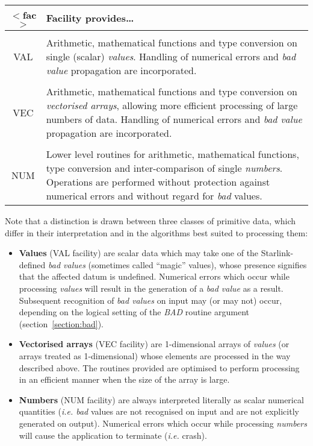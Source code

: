 \documentclass[11pt,nolof]{starlink}
\providecommand{\name}[1]{#1}
\providecommand{\fortvar}[1]{\emph{#1}}
\begin{document}
\begin{center}
\begin{tabular}{c|p{33em}}

\textbf{$<$fac$>$} & \textbf{Facility provides\ldots } \\
\hline
\\
VAL & Arithmetic, mathematical functions and type conversion on single
(scalar) \emph{values}.
Handling of numerical errors and \emph{bad value} propagation are
incorporated.\\
\\
VEC & Arithmetic, mathematical functions and type conversion on \emph{vectorised arrays}, allowing more efficient processing of large numbers of
data.
Handling of numerical errors and \emph{bad value} propagation are
incorporated.\\
\\
NUM & Lower level routines for arithmetic, mathematical functions, type
conversion and inter-comparison of single \emph{numbers}.
Operations are performed without protection against numerical errors and
without regard for \emph{bad} values.
\\
\end{tabular}
\end{center}

Note that a distinction is drawn between three classes of primitive data,
which differ in their interpretation and in the algorithms best suited to
processing them:

\begin{itemize}

\item \textbf{Values} (\name{VAL} facility) are scalar data which may take one
of the Starlink-defined \emph{bad values} (sometimes called ``magic''
values), whose presence signifies that the affected datum is undefined.
Numerical errors which occur while processing \emph{values} will result in
the generation of a \emph{bad value} as a result.
Subsequent recognition of \emph{bad values} on input may (or may not) occur,
depending on the logical setting of the \fortvar{BAD} routine argument
(section~\ref{section:bad}).

\item \textbf{Vectorised arrays} (\name{VEC} facility) are 1-dimensional arrays
of \emph{values} (or arrays treated as 1-dimensional) whose elements are
processed in the way described above.
The routines provided are optimised to perform processing in an efficient
manner when the size of the array is large.

\item \textbf{Numbers} (\name{NUM} facility) are always interpreted literally
as scalar numerical quantities (\emph{i.e. bad} values are not recognised on
input and are not explicitly generated on output).
Numerical errors which occur while processing \emph{numbers} will cause the
application to terminate (\emph{i.e.} crash).

\end{itemize}
\end{document}
